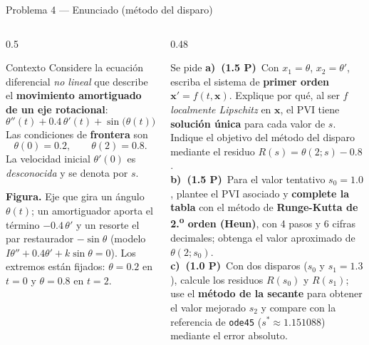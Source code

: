 \documentclass[aspectratio=169,10pt]{beamer}
\begin{document}
\begin{frame}{Problema 4 — Enunciado (método del disparo)}
\begin{columns}[T]
\begin{column}{0.5\textwidth}
\begin{cardidea}{Contexto}{\faCrosshairs}
{\footnotesize Considere la ecuación diferencial \emph{no lineal} que describe el \textbf{movimiento amortiguado de un eje rotacional}:
\[
\theta''(t)+0.4\,\theta'(t)+\sin\big(\theta(t)\big)=0,\quad 0\le t\le 2.
\]
Las condiciones de \textbf{frontera} son
\[
\theta(0)=0.2,\qquad \theta(2)=0.8.
\]
La velocidad inicial $\theta'(0)$ es \emph{desconocida} y se denota por $s$.}
\end{cardidea}
\vspace{1mm}
\begin{cardnota}[\faInfoCircle]
{\footnotesize \textbf{Figura.} Eje que gira un ángulo $\theta(t)$; un amortiguador aporta el término $-0.4\,\theta'$ y un resorte el par restaurador $-\sin\theta$ (modelo $I\theta''+0.4\theta'+k\sin\theta=0$). Los extremos están fijados: $\theta=0.2$ en $t=0$ y $\theta=0.8$ en $t=2$.}
\end{cardnota}
\end{column}
\begin{column}{0.48\textwidth}
\begin{cardidea}{Se pide}{\faTasks}
{\footnotesize
\textbf{a)\ (1.5 P)}\ Con $x_1=\theta$, $x_2=\theta'$, escriba el sistema de \textbf{primer orden} $\mathbf{x}'=f(t,\mathbf{x})$. Explique por qué, al ser $f$ \emph{localmente Lipschitz} en $\mathbf{x}$, el PVI tiene \textbf{solución única} para cada valor de $s$. Indique el objetivo del método del disparo mediante el residuo $R(s)=\theta(2;s)-0.8$.\\[1.0mm]
\textbf{b)\ (1.5 P)}\ Para el valor tentativo $s_0=1.0$, plantee el PVI asociado y \textbf{complete la tabla} con el método de \textbf{Runge-Kutta de 2.\textsuperscript{o} orden (Heun)}, con 4 pasos y 6 cifras decimales; obtenga el valor aproximado de $\theta(2;s_0)$.\\[1.0mm]
\textbf{c)\ (1.0 P)}\ Con dos disparos ($s_0$ y $s_1=1.3$), calcule los residuos $R(s_0)$ y $R(s_1)$; use el \textbf{método de la secante} para obtener el valor mejorado $s_2$ y compare con la referencia de \texttt{ode45} ($s^*\approx1.151088$) mediante el error absoluto.}
\end{cardidea}
\end{column}
\end{columns}
\end{frame}
\end{document}
